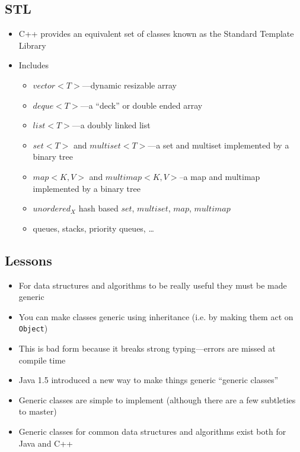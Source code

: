 
\begin{slide}
\section[-1.5]{STL}
\begin{PauseHighLight}
  \begin{itemize}
  \item C++ provides an equivalent set of classes known as the Standard
    Template Library\pause
  \item Includes
    \begin{itemize}
    \item \jl$vector<T>$---dynamic resizable array
    \item \jl$deque<T>$---a ``deck'' or double ended array
    \item \jl$list<T>$---a doubly linked list
    \item \jl$set<T>$ and \jl$multiset<T>$---a set and multiset
      implemented by a binary tree
    \item \jl$map<K,V>$ and \jl$multimap<K,V>$--a map and multimap
      implemented by a binary tree
    \item \jl$unordered_X$ hash based \jl$set$, \jl$multiset$,
      \jl$map$,  \jl$multimap$
    \item queues, stacks, priority queues, \ldots
    \end{itemize}\pause
  \end{itemize}
\end{PauseHighLight}
\end{slide}


\begin{slide}
\section[-2]{Lessons}

\begin{PauseHighLight}
  \begin{itemize}\squeeze
  \item For data structures and algorithms to be really useful they must
    be made generic\pause
  \item You can make classes generic using inheritance (i.e. by making
    them act on \texttt{Object})\pause
  \item This is bad form because it breaks strong typing---errors are
    missed at compile time\pause
  \item Java 1.5 introduced a new way to make things generic ``generic
    classes''\pause
  \item Generic classes are simple to implement (although there are a
    few subtleties to master)\pause
  \item Generic classes for common data structures and algorithms exist
    both for Java and C++\pause
  \end{itemize}
\end{PauseHighLight}
\end{slide}
